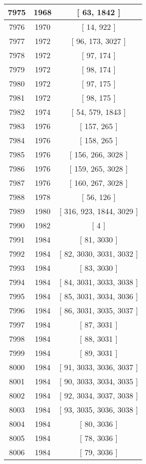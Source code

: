 \begin{center}
\begin{longtable}[H]{|| c c c ||}
\hline
7975 & 1968 & [ 63, 1842 ] \\ 
\hline
7976 & 1970 & [ 14, 922 ] \\ 
\hline
7977 & 1972 & [ 96, 173, 3027 ] \\ 
\hline
7978 & 1972 & [ 97, 174 ] \\ 
\hline
7979 & 1972 & [ 98, 174 ] \\ 
\hline
7980 & 1972 & [ 97, 175 ] \\ 
\hline
7981 & 1972 & [ 98, 175 ] \\ 
\hline
7982 & 1974 & [ 54, 579, 1843 ] \\ 
\hline
7983 & 1976 & [ 157, 265 ] \\ 
\hline
7984 & 1976 & [ 158, 265 ] \\ 
\hline
7985 & 1976 & [ 156, 266, 3028 ] \\ 
\hline
7986 & 1976 & [ 159, 265, 3028 ] \\ 
\hline
7987 & 1976 & [ 160, 267, 3028 ] \\ 
\hline
7988 & 1978 & [ 56, 126 ] \\ 
\hline
7989 & 1980 & [ 316, 923, 1844, 3029 ] \\ 
\hline
7990 & 1982 & [ 4 ] \\ 
\hline
7991 & 1984 & [ 81, 3030 ] \\ 
\hline
7992 & 1984 & [ 82, 3030, 3031, 3032 ] \\ 
\hline
7993 & 1984 & [ 83, 3030 ] \\ 
\hline
7994 & 1984 & [ 84, 3031, 3033, 3038 ] \\ 
\hline
7995 & 1984 & [ 85, 3031, 3034, 3036 ] \\ 
\hline
7996 & 1984 & [ 86, 3031, 3035, 3037 ] \\ 
\hline
7997 & 1984 & [ 87, 3031 ] \\ 
\hline
7998 & 1984 & [ 88, 3031 ] \\ 
\hline
7999 & 1984 & [ 89, 3031 ] \\ 
\hline
8000 & 1984 & [ 91, 3033, 3036, 3037 ] \\ 
\hline
8001 & 1984 & [ 90, 3033, 3034, 3035 ] \\ 
\hline
8002 & 1984 & [ 92, 3034, 3037, 3038 ] \\ 
\hline
8003 & 1984 & [ 93, 3035, 3036, 3038 ] \\ 
\hline
8004 & 1984 & [ 80, 3036 ] \\ 
\hline
8005 & 1984 & [ 78, 3036 ] \\ 
\hline
8006 & 1984 & [ 79, 3036 ] \\ 

\end{longtable}
\end{center}
